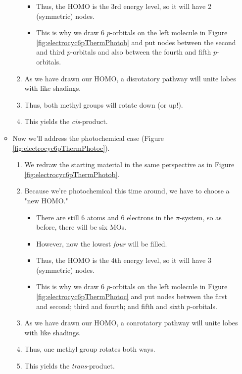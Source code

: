 \documentclass[../notes.tex]{subfiles}
\begin{document}
\begin{itemize}
\begin{itemize}
\begin{enumerate}
\begin{itemize}
\begin{itemize}
                \end{itemize}
                \item Thus, the HOMO is the 3rd energy level, so it will have 2 (symmetric) nodes.
                \item This is why we draw 6 $p$-orbitals on the left molecule in Figure \ref{fig:electrocyc6pThermPhotob} and put nodes between the second and third $p$-orbitals and also between the fourth and fifth $p$-orbitals.
            \end{itemize}
            \item As we have drawn our HOMO, a disrotatory pathway will unite lobes with like shadings.
            \item Thus, both methyl groups will rotate down (or up!).
            \item This yields the \emph{cis}-product.
        \end{enumerate}
        \item Now we'll address the photochemical case (Figure \ref{fig:electrocyc6pThermPhotoc}).
        \begin{enumerate}
            \item We redraw the starting material in the same perspective as in Figure \ref{fig:electrocyc6pThermPhotob}.
            \item Because we're photochemical this time around, we have to choose a "new HOMO."
            \begin{itemize}
                \item There are still 6 atoms and 6 electrons in the $\pi$-system, so as before, there will be six MOs.
                \item However, now the lowest \emph{four} will be filled.
                \item Thus, the HOMO is the 4th energy level, so it will have 3 (symmetric) nodes.
                \item This is why we draw 6 $p$-orbitals on the left molecule in Figure \ref{fig:electrocyc6pThermPhotoc} and put nodes between the first and second; third and fourth; and fifth and sixth $p$-orbitals.
            \end{itemize}
            \item As we have drawn our HOMO, a conrotatory pathway will unite lobes with like shadings.
            \item Thus, one methyl group rotates both ways.
            \item This yields the \emph{trans}-product.

\end{enumerate}
\end{itemize}
\end{itemize}
\end{document}
